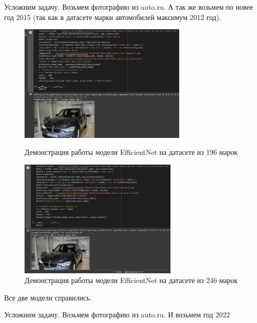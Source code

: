 \documentclass[14pt]{extarticle}
\begin{document}
Усложним задачу. Возьмем фотографию из auto.ru. А так же возьмем по новее год 2015 (так как в датасете марки автомобилей максимум 2012 год).
\begin{figure}[H]
\centering
\begin{minipage}{0.49\textwidth}
  \centering
  \includegraphics[height=5.6cm]{images/14.png}  
  \caption{Демонстрация работы модели \foreignlanguage{english}{EfficientNet} на датасете из 196 марок}
  \label{fig:12}
\end{minipage}
\hfill
\begin{minipage}{0.49\textwidth}
  \centering
  \includegraphics[height=5.6cm]{images/15.png}  
  \caption{Демонстрация работы модели \foreignlanguage{english}{EfficientNet} на датасете из 246 марок}
  \label{fig:13}
\end{minipage}
\end{figure}

\noindent Все две модели справились.

\noindent Усложним задачу. Возьмем фотографию из auto.ru. И возьмем год 2022
\end{document}
